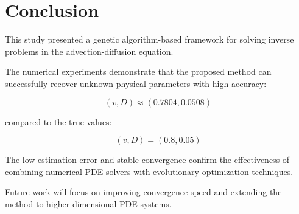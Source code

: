 \section{Conclusion}

This study presented a genetic algorithm-based framework for solving inverse problems in the advection-diffusion equation.

The numerical experiments demonstrate that the proposed method can successfully recover unknown physical parameters with high accuracy:

\[
(v, D) \approx (0.7804, 0.0508)
\]

compared to the true values:

\[
(v, D) = (0.8, 0.05)
\]

The low estimation error and stable convergence confirm the effectiveness of combining numerical PDE solvers with evolutionary optimization techniques.

Future work will focus on improving convergence speed and extending the method to higher-dimensional PDE systems.